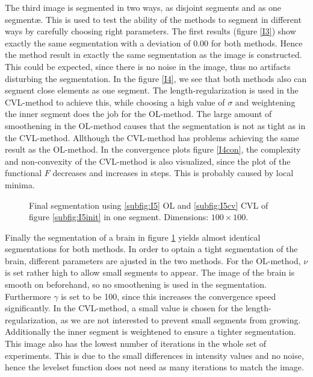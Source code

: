 The third image is segmented in two ways, as disjoint segments and as one segmentæ. This is used to test the ability of the methods to segment in different ways by carefully choosing right parameters. The first results (figure \ref{I3}) show exactly the same segmentation with a deviation of $0.00$ for both methods. Hence the method result in exactly the same segmentation as the image is constructed. This could be expected, since there is no noise in the image, thus no artifacts disturbing the segmentation. In the figure \ref{I4}, we see that both methods also can segment close elements as one segment. The length-regularization is used in the CVL-method to achieve this, while choosing a high value of $\sigma$ and weightening the inner segment does the job for the OL-method. The large amount of smoothening in the OL-method causes that the segmentation is not as tight as in the CVL-method. Allthough the CVL-method has problems achieving the same result as the OL-method. In the convergence plots figure \ref{I4con}, the complexity and non-convexity of the CVL-method is also visualized, since the plot of the functional $F$ decreases and increases in steps. This is probably caused by local minima.\\

\begin{figure}[h]
  \centering
  \caption{Final segmentation using \ref{subfig:I5} OL and \ref{subfig:I5cv} CVL of figure \ref{subfig:I5init} in one segment. Dimensions: $100\times 100$.}\label{I5}
\end{figure}

Finally the segmentation of a brain in figure \ref{I5} yields almost identical segmentations for both methods. In order to optain a tight segmentation of the brain, different parameters are ajusted in the two methods. For the OL-method, $\nu$ is set rather high to allow small segments to appear. The image of the brain is smooth on beforehand, so no smoothening is used in the segmentation. Furthermore $\gamma$ is set to be 100, since this increases the convergence speed significantly. In the CVL-method, a small value is chosen for the length-regularization, as we are not interested to prevent small segments from growing. Additionally the inner segment is weightened to ensure a tighter segmentation. This image also has the lowest number of iterations in the whole set of experiments. This is due to the small differences in intensity values and no noise, hence the levelset function does not need as many iterations to match the image.\\

